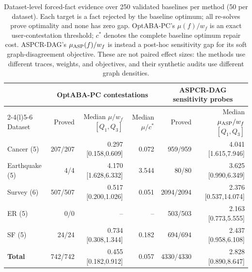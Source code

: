 \begin{table}[t]
\centering
\small
\begin{tabular}{@{}lrrrrr@{}}
\toprule
 & \multicolumn{3}{c}{OptABA-PC contestations} & \multicolumn{2}{c}{ASPCR-DAG sensitivity probes} \\
\cmidrule(lr){2-4}\cmidrule(l){5-6}
Dataset & Proved & Median $\mu/w_f$ $[Q_1,Q_3]$ & Median $\mu/c^*$ & Proved & Median $\mu_{\rm ASP}/w_f$ $[Q_1,Q_3]$ \\
\midrule
Cancer (5) & 207/207 & 0.297 [0.158,0.609] & 0.072 & 959/959 & 4.041 [1.615,7.946] \\
Earthquake (5) & 4/4 & 4.170 [1.628,6.332] & 3.544 & 80/80 & 3.625 [0.990,6.349] \\
Survey (6) & 507/507 & 0.517 [0.200,1.026] & 0.051 & 2094/2094 & 2.376 [0.537,14.074] \\
ER (5) & 0/0 & -- & -- & 503/503 & 2.163 [0.773,5.555] \\
SF (5) & 24/24 & 0.734 [0.308,1.344] & 0.182 & 694/694 & 2.437 [0.958,6.108] \\
\midrule
\textbf{Total} & 742/742 & 0.455 [0.182,0.912] & 0.057 & 4330/4330 & 2.828 [0.890,8.647] \\
\bottomrule
\end{tabular}
\caption{Dataset-level forced-fact evidence over 250 validated baselines per method (50 per dataset). Each target is a fact rejected by the baseline optimum; all re-solves prove optimality and none has zero gap. OptABA-PC's $\mu(f)/w_f$ is an exact user-contestation threshold; $c^*$ denotes the complete baseline optimum repair cost. ASPCR-DAG's $\mu_{\rm ASP}(f)/w_f$ is instead a post-hoc sensitivity gap for its soft graph-disagreement objective. These are not paired effect sizes: the methods use different traces, weights, and objectives, and their synthetic audits use different graph densities.}
\label{tab:margin-by-dataset}
\end{table}
